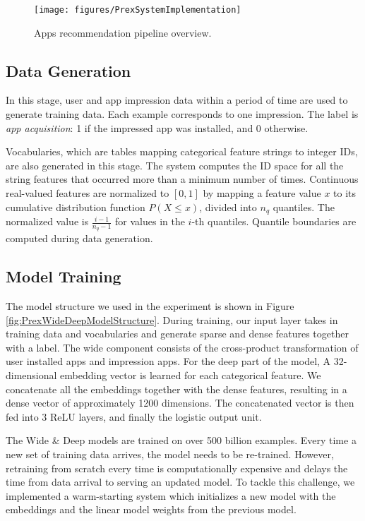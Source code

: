 \documentclass{sig-alternate-05-2015}
\begin{document}
\begin{figure}[t!]
	\centering
	\texttt{[image: figures/PrexSystemImplementation]}
	\caption{Apps recommendation pipeline overview.}
	\label{fig:PrexSystemImplementation}
\end{figure}

\subsection{Data Generation}
In this stage, user and app impression data within a period of time are used to generate training data. Each example corresponds to one impression. The label is \textit{app acquisition}: 1 if the impressed app was installed, and 0 otherwise. 

Vocabularies, which are tables mapping categorical feature strings to integer IDs, are also generated in this stage. The system computes the ID space for all the string features that occurred more than a minimum number of times.
Continuous real-valued features are normalized to $[0,1]$ by mapping a feature value $x$ to its cumulative distribution function $P(X \le x)$, divided into $n_q$ quantiles. The normalized value is $\frac{i-1}{n_q-1}$ for values in the $i$-th quantiles. Quantile boundaries are computed during data generation.

\subsection{Model Training}

The model structure we used in the experiment is shown in Figure \ref{fig:PrexWideDeepModelStructure}. During training, our input layer takes in training data and vocabularies and generate sparse and dense features together with a label. The wide component consists of the cross-product transformation of user installed apps and impression apps. For the deep part of the model, A 32-dimensional embedding vector is learned for each categorical feature. We concatenate all the embeddings together with the dense features, resulting in a dense vector of approximately 1200 dimensions. The concatenated vector is then fed into 3 ReLU layers, and finally the logistic output unit.

The Wide \& Deep models are trained on over 500 billion examples. Every time a new set of training data arrives, the model needs to be re-trained. However, retraining from scratch every time is computationally expensive and delays the time from data arrival to serving an updated model. To tackle this challenge, we implemented a warm-starting system which initializes a new model with the embeddings and the linear model weights from the previous model.
\end{document}
